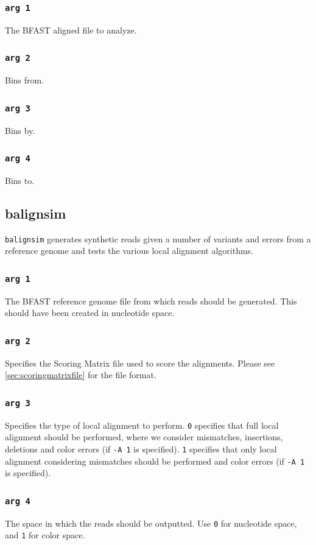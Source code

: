 \documentclass[a4paper,12pt]{book}
\newcommand{\TT}[1]{{\tt #1}} %
\newcommand{\BRGF}{BFAST reference genome file} %
\newcommand{\BAF}{BFAST aligned file} %
\begin{document}
\subsubsection{\TT{arg 1}}
The \BAF{} to analyze.
\subsubsection{\TT{arg 2}}
Bins from.
\subsubsection{\TT{arg 3}}
Bins by.
\subsubsection{\TT{arg 4}}
Bins to.
\subsection{balignsim}
\label{sec:balignsim}
\TT{balignsim} generates synthetic reads given a number of variants and errors from a reference genome and tests the various local alignment algorithms.

\subsubsection{\TT{arg 1}}
The \BRGF{} from which reads should be generated.
This should have been created in nucleotide space.
\subsubsection{\TT{arg 2}}
Specifies the Scoring Matrix file used to score the alignments.
Please see \autoref{sec:scoringmatrixfile} for the file format.
\subsubsection{\TT{arg 3}}
Specifies the type of local alignment to perform.
\TT{0} specifies that full local alignment should be performed, where we consider mismatches, insertions, deletions and color errors (if \TT{-A 1} is specified).
\TT{1} specifies that only local alignment considering mismatches should be performed and color errors (if \TT{-A 1} is specified).
\subsubsection{\TT{arg 4}}
The space in which the reads should be outputted.
Use \TT{0} for nucleotide space, and \TT{1} for color space.
\end{document}
